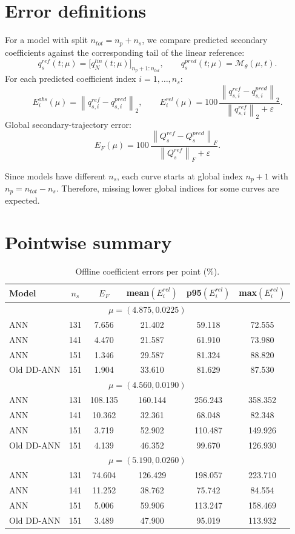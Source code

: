 \documentclass[11pt]{article}
\begin{document}
\section*{Error definitions}
For a model with split $n_{tot}=n_p+n_s$, we compare predicted secondary coefficients against the corresponding tail of the linear reference:
\[
q_s^{ref}(t;\mu)=\big[q_N^{lin}(t;\mu)\big]_{n_p+1:n_{tot}},
\qquad
q_s^{pred}(t;\mu)=\mathcal M_{\theta}(\mu,t).
\]
For each predicted coefficient index $i=1,\dots,n_s$:
\[
E_i^{abs}(\mu)=\left\|q_{s,i}^{ref}-q_{s,i}^{pred}\right\|_2,
\qquad
E_i^{rel}(\mu)=100\,
\frac{\left\|q_{s,i}^{ref}-q_{s,i}^{pred}\right\|_2}
{\left\|q_{s,i}^{ref}\right\|_2+\varepsilon}.
\]
Global secondary-trajectory error:
\[
E_F(\mu)=100\,
\frac{\left\|Q_s^{ref}-Q_s^{pred}\right\|_F}
{\left\|Q_s^{ref}\right\|_F+\varepsilon}.
\]

Since models have different $n_s$, each curve starts at global index $n_p+1$ with $n_p=n_{tot}-n_s$.
Therefore, missing lower global indices for some curves are expected.

\section*{Pointwise summary}
\begin{table}[H]
\centering
\caption{Offline coefficient errors per point (\%).}
\begin{tabular}{lccccc}
\toprule
Model & $n_s$ & $E_F$ & mean$(E_i^{rel})$ & p95$(E_i^{rel})$ & max$(E_i^{rel})$ \\
\midrule
\multicolumn{6}{c}{\(\mu=(4.875,0.0225)\)} \\
\midrule
ANN & 131 & 7.656 & 21.402 & 59.118 & 72.555 \\
ANN & 141 & 4.470 & 21.587 & 61.910 & 73.980 \\
ANN & 151 & 1.346 & 29.587 & 81.324 & 88.820 \\
Old DD-ANN & 151 & 1.904 & 33.610 & 81.629 & 87.530 \\
\midrule
\multicolumn{6}{c}{\(\mu=(4.560,0.0190)\)} \\
\midrule
ANN & 131 & 108.135 & 160.144 & 256.243 & 358.352 \\
ANN & 141 & 10.362 & 32.361 & 68.048 & 82.348 \\
ANN & 151 & 3.719 & 52.902 & 110.487 & 149.926 \\
Old DD-ANN & 151 & 4.139 & 46.352 & 99.670 & 126.930 \\
\midrule
\multicolumn{6}{c}{\(\mu=(5.190,0.0260)\)} \\
\midrule
ANN & 131 & 74.604 & 126.429 & 198.057 & 223.710 \\
ANN & 141 & 11.252 & 38.762 & 75.742 & 84.554 \\
ANN & 151 & 5.006 & 59.906 & 113.247 & 158.469 \\
Old DD-ANN & 151 & 3.489 & 47.900 & 95.019 & 113.932 \\
\midrule
\bottomrule
\end{tabular}
\end{table}
\end{document}
